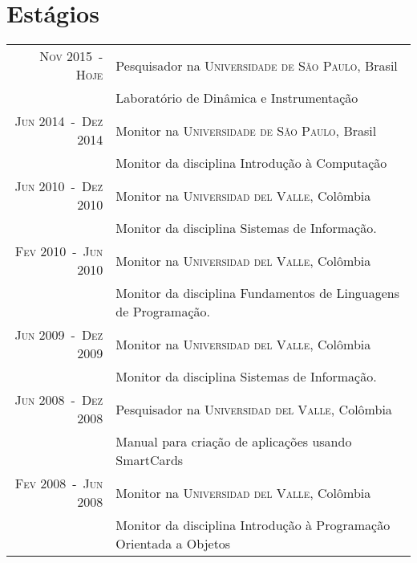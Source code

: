 \documentclass[a4paper,10pt]{article}
\begin{document}
\section{Estágios}
\begin{tabular}{rl}

  \textsc{Nov 2015~-~Hoje}      & Pesquisador na \textsc{Universidade de São Paulo}, Brasil \\
                                &\footnotesize{Laboratório de Dinâmica e Instrumentação} \\

  \textsc{Jun 2014~-~Dez 2014}  & Monitor na \textsc{Universidade de São Paulo}, Brasil \\
                                &\footnotesize{Monitor da disciplina Introdução à Computação} \\

  \textsc{Jun 2010~-~Dez 2010}  & Monitor na \textsc{Universidad del Valle}, Colômbia \\
                                &\footnotesize{Monitor da disciplina Sistemas de Informação.} \\

  \textsc{Fev 2010~-~Jun 2010}  & Monitor na \textsc{Universidad del Valle}, Colômbia \\
                                &\footnotesize{Monitor da disciplina Fundamentos de Linguagens de Programação.} \\

  \textsc{Jun 2009~-~Dez 2009}  & Monitor na \textsc{Universidad del Valle}, Colômbia \\
                                &\footnotesize{Monitor da disciplina Sistemas de Informação.} \\

  \textsc{Jun 2008~-~Dez 2008}  & Pesquisador na \textsc{Universidad del Valle}, Colômbia \\
                                &\footnotesize{Manual para criação de aplicações usando SmartCards} \\

  \textsc{Fev 2008~-~Jun 2008}  & Monitor na \textsc{Universidad del Valle}, Colômbia \\
                                &\footnotesize{Monitor da disciplina Introdução à Programação Orientada a Objetos} \\

\end{tabular}
\end{document}
